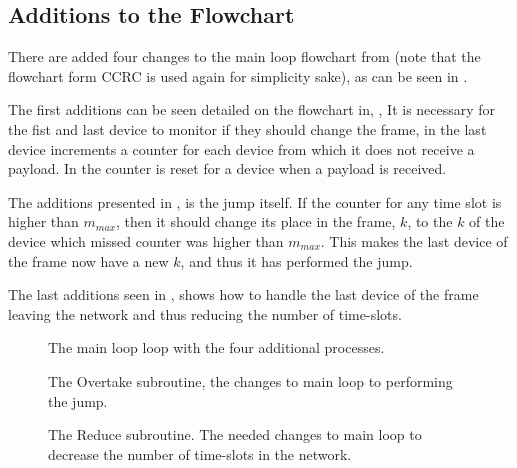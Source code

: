 \subsection{Additions to the Flowchart}
There are added four changes to the main loop flowchart from  (note that the flowchart form CCRC is used again for simplicity sake), as can be seen in .

The first additions can be seen detailed on the flowchart in, ,
It is necessary for the fist and last device to monitor if they should change the frame, in  the last device increments a counter for each device from which it does not receive a payload.
In  the counter is reset for a device when a payload is received.

The additions presented in , is the jump itself.
If the counter for any time slot is higher than $m_{max}$, then it should change its place in the frame, $k$, to the $k$ of the device which missed counter was higher than $m_{max}$.
This makes the last device of the frame now have a new $k$, and thus it has performed the jump.	

The last additions seen in , shows how to handle the last device of the frame leaving the network and thus reducing the number of time-slots.
                                                                         
\begin{figure}[!p] 
\vspace{-15pt} 
\centering
\footnotesize

\caption{The main loop loop with the four additional processes.}
\label{fig:mainFrameDefrag}   
\end{figure}  

  

\begin{figure}[!p]
\centering
\footnotesize

\caption{The Overtake subroutine, the changes to main loop to performing the jump.}
\label{fig:jd2}    
\end{figure}

\begin{figure}[!p]
\centering
\footnotesize

\caption{The Reduce subroutine. The needed changes to main loop to decrease the number of time-slots in the network.}
\label{fig:jd3}    
\end{figure}   
